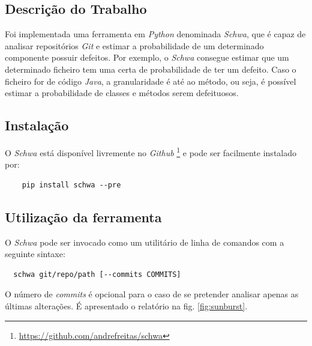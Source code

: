 \documentclass[9pt,a4paper]{extarticle}
\begin{document}
\begin{multicols}{2}
\section{Descrição do Trabalho}\label{sec:work}
Foi implementada uma ferramenta em \emph{Python} denominada \emph{Schwa}, que é capaz de
analisar repositórios \emph{Git} e estimar a probabilidade de um determinado componente
possuir defeitos. Por exemplo, o \emph{Schwa} consegue estimar que um determinado
ficheiro tem uma certa de probabilidade de ter um defeito. Caso o ficheiro for
de código \emph{Java}, a granularidade é até ao método, ou seja, é possível estimar
a probabilidade de classes e métodos serem defeituosos.

\subsection{Instalação}
O \emph{Schwa} está disponível livremente no \emph{Github}
\footnote{\url{https://github.com/andrefreitas/schwa}} e pode ser facilmente
instalado por:
\begin{verbatim}
    pip install schwa --pre
\end{verbatim}

\subsection{Utilização da ferramenta}
O \emph{Schwa} pode ser invocado como um utilitário de linha de comandos com a
seguinte sintaxe:

\begin{verbatim}
  schwa git/repo/path [--commits COMMITS]
\end{verbatim}

O número de \emph{commits} é opcional para o caso de se pretender analisar
apenas as últimas alterações. É apresentado o relatório na fig. \ref{fig:sunburst}.


\end{multicols}
\end{document}
